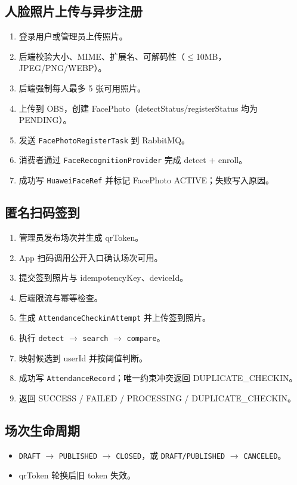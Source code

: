 \documentclass[11pt,a4paper]{ctexart}
\newcommand{\tech}[1]{\texttt{\small#1}}
\begin{document}
\subsection{人脸照片上传与异步注册}
\begin{enumerate}[leftmargin=2.5em]
  \item 登录用户或管理员上传照片。
  \item 后端校验大小、MIME、扩展名、可解码性（$\le$10MB，JPEG/PNG/WEBP）。
  \item 后端强制每人最多 5 张可用照片。
  \item 上传到 OBS，创建 FacePhoto（detectStatus/registerStatus 均为 PENDING）。
  \item 发送 \tech{FacePhotoRegisterTask} 到 RabbitMQ。
  \item 消费者通过 \tech{FaceRecognitionProvider} 完成 detect + enroll。
  \item 成功写 \tech{HuaweiFaceRef} 并标记 FacePhoto ACTIVE；失败写入原因。
\end{enumerate}

\subsection{匿名扫码签到}
\begin{enumerate}[leftmargin=2.5em]
  \item 管理员发布场次并生成 qrToken。
  \item App 扫码调用公开入口确认场次可用。
  \item 提交签到照片与 idempotencyKey、deviceId。
  \item 后端限流与幂等检查。
  \item 生成 \tech{AttendanceCheckinAttempt} 并上传签到照片。
  \item 执行 \texttt{detect} $\rightarrow$ \texttt{search} $\rightarrow$ \texttt{compare}。
  \item 映射候选到 userId 并按阈值判断。
  \item 成功写 \tech{AttendanceRecord}；唯一约束冲突返回 DUPLICATE\_CHECKIN。
  \item 返回 SUCCESS / FAILED / PROCESSING / DUPLICATE\_CHECKIN。
\end{enumerate}

\subsection{场次生命周期}
\begin{itemize}[leftmargin=2.5em]
  \item \texttt{DRAFT} $\rightarrow$ \texttt{PUBLISHED} $\rightarrow$ \texttt{CLOSED}，或 \texttt{DRAFT/PUBLISHED} $\rightarrow$ \texttt{CANCELED}。
  \item qrToken 轮换后旧 token 失效。
\end{itemize}
\end{document}
